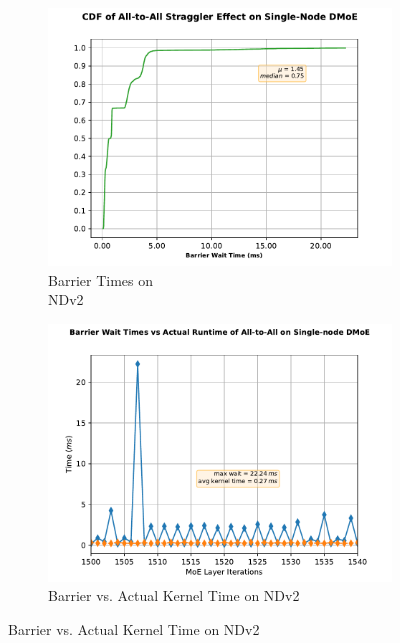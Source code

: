 \begin{figure}[!h]
    \begin{subfigure}{.5\linewidth}
        \centering
        \includegraphics[width=0.8\linewidth]{images/barrier_s}
        \caption{Barrier Times on \\ NDv2}
        \label{singleecdf}
    \end{subfigure}\hfill %
    \begin{subfigure}{.5\linewidth}
        \centering
        \includegraphics[width=0.8\linewidth]{images/s_distribution}
        \caption{Barrier vs. Actual Kernel Time on NDv2}
        \label{singlebarriers}
    \end{subfigure}


\end{figure}

